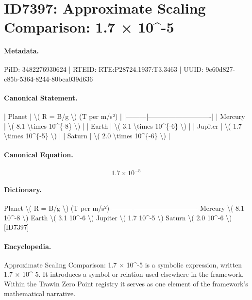 \section*{ID7397: Approximate Scaling Comparison: 1.7 × 10\textasciicircum{}-5}
\paragraph{Metadata.}
PiID: 3482276930624 | RTEID: RTE:P28724.1937:T3.3463 | UUID: 9e60d827-c85b-5364-8244-80bca039d636

\paragraph{Canonical Statement.}
| Planet | \textbackslash{}( R = B/g \textbackslash{}) (T per m/s²) | |---------|----------------------------| | Mercury | \textbackslash{}( 8.1 \textbackslash{}times 10\textasciicircum{}\{-8\} \textbackslash{}) | | Earth | \textbackslash{}( 3.1 \textbackslash{}times 10\textasciicircum{}\{-6\} \textbackslash{}) | | Jupiter | \textbackslash{}( 1.7 \textbackslash{}times 10\textasciicircum{}\{-5\} \textbackslash{}) | | Saturn | \textbackslash{}( 2.0 \textbackslash{}times 10\textasciicircum{}\{-6\} \textbackslash{}) |

\paragraph{Canonical Equation.}
\[
1.7 \times 10^{-5}
\]

\paragraph{Dictionary.}
Planet \textbackslash{}( R = B/g \textbackslash{}) (T per m/s²) --------- ---------------------------- Mercury \textbackslash{}( 8.1 10\textasciicircum{}-8 \textbackslash{}) Earth \textbackslash{}( 3.1 10\textasciicircum{}-6 \textbackslash{}) Jupiter \textbackslash{}( 1.7 10\textasciicircum{}-5 \textbackslash{}) Saturn \textbackslash{}( 2.0 10\textasciicircum{}-6 \textbackslash{}) [ID7397]

\paragraph{Encyclopedia.}
Approximate Scaling Comparison: 1.7 × 10\textasciicircum{}-5 is a symbolic expression, written 1.7 × 10\textasciicircum{}-5. It introduces a symbol or relation used elsewhere in the framework. Within the Trawin Zero Point registry it serves as one element of the framework's mathematical narrative.
